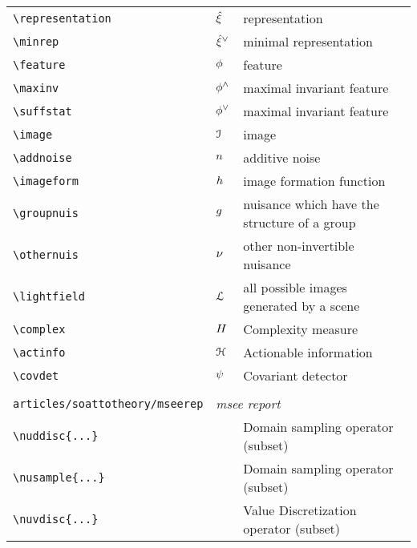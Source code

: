 \begin{longtable}{lll}
 {\color[rgb]{0.5,0.5,0.5}\texttt{\textbackslash representation}} & $\hat{\xi}$ &  representation\\ 
 {\color[rgb]{0.5,0.5,0.5}\texttt{\textbackslash minrep}} & ${\hat{\xi}}^{\vee}$ &  minimal representation\\ 
 {\color[rgb]{0.5,0.5,0.5}\texttt{\textbackslash feature}} & $\phi$ &  feature\\ 
 {\color[rgb]{0.5,0.5,0.5}\texttt{\textbackslash maxinv}} & $\phi^{\wedge}$ &  maximal invariant feature\\ 
 {\color[rgb]{0.5,0.5,0.5}\texttt{\textbackslash suffstat}} & $\phi^{\vee}$ &  maximal invariant feature\\ 
 {\color[rgb]{0.5,0.5,0.5}\texttt{\textbackslash image}} & $\mathcal{I}$ &  image\\ 
 {\color[rgb]{0.5,0.5,0.5}\texttt{\textbackslash addnoise}} & $n$ &  additive noise\\ 
 {\color[rgb]{0.5,0.5,0.5}\texttt{\textbackslash imageform}} & $h$ &  image formation function\\ 
 {\color[rgb]{0.5,0.5,0.5}\texttt{\textbackslash groupnuis}} & $g$ &  nuisance which have the structure of a group\\ 
 {\color[rgb]{0.5,0.5,0.5}\texttt{\textbackslash othernuis}} & $\nu$ &  other non-invertible nuisance\\ 
 {\color[rgb]{0.5,0.5,0.5}\texttt{\textbackslash lightfield}} & $\mathcal{L}$ &  all possible images generated by a scene\\ 
 {\color[rgb]{0.5,0.5,0.5}\texttt{\textbackslash complex}} & $H$ &  Complexity measure\\ 
 {\color[rgb]{0.5,0.5,0.5}\texttt{\textbackslash actinfo}} & $\mathcal{H}$ &  Actionable information\\ 
 {\color[rgb]{0.5,0.5,0.5}\texttt{\textbackslash covdet}} & $\psi$ &  Covariant detector\\ 
  &  & \\ 
 {\color[rgb]{0.5,0.5,0.5}\texttt{articles/soattotheory/mseerep}} & \multicolumn{2}{l}{\emph{msee report}}\\ 
 \hline
{\color[rgb]{0.5,0.5,0.5}\texttt{\textbackslash nuddisc\{...\}}} &  &  Domain sampling operator (subset)\\ 
 {\color[rgb]{0.5,0.5,0.5}\texttt{\textbackslash nusample\{...\}}} &  &  Domain sampling operator (subset)\\ 
 {\color[rgb]{0.5,0.5,0.5}\texttt{\textbackslash nuvdisc\{...\}}} &  &  Value Discretization operator (subset)\\ 

\end{longtable}
